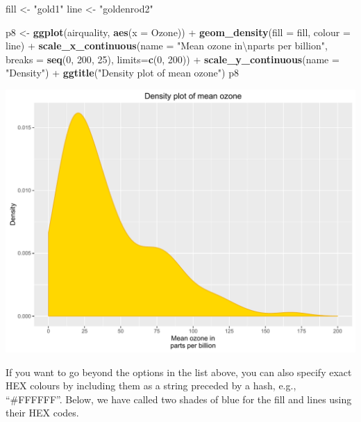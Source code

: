 \documentclass[]{article}
\newenvironment{Shaded}{\begin{snugshade}}{\end{snugshade}}
\newcommand{\KeywordTok}[1]{\textcolor[rgb]{0.13,0.29,0.53}{\textbf{{#1}}}}
\newcommand{\DataTypeTok}[1]{\textcolor[rgb]{0.13,0.29,0.53}{{#1}}}
\newcommand{\DecValTok}[1]{\textcolor[rgb]{0.00,0.00,0.81}{{#1}}}
\newcommand{\CharTok}[1]{\textcolor[rgb]{0.31,0.60,0.02}{{#1}}}
\newcommand{\StringTok}[1]{\textcolor[rgb]{0.31,0.60,0.02}{{#1}}}
\newcommand{\NormalTok}[1]{{#1}}
\begin{document}
\begin{Shaded}
\begin{Highlighting}[]
\NormalTok{fill <-}\StringTok{ "gold1"}
\NormalTok{line <-}\StringTok{ "goldenrod2"}

\NormalTok{p8 <-}\StringTok{ }\KeywordTok{ggplot}\NormalTok{(airquality, }\KeywordTok{aes}\NormalTok{(}\DataTypeTok{x =} \NormalTok{Ozone)) +}\StringTok{ }
\StringTok{      }\KeywordTok{geom_density}\NormalTok{(}\DataTypeTok{fill =} \NormalTok{fill, }\DataTypeTok{colour =} \NormalTok{line) +}
\StringTok{      }\KeywordTok{scale_x_continuous}\NormalTok{(}\DataTypeTok{name =} \StringTok{"Mean ozone in}\CharTok{\textbackslash{}n}\StringTok{parts per billion"}\NormalTok{,}
                         \DataTypeTok{breaks =} \KeywordTok{seq}\NormalTok{(}\DecValTok{0}\NormalTok{, }\DecValTok{200}\NormalTok{, }\DecValTok{25}\NormalTok{),}
                         \DataTypeTok{limits=}\KeywordTok{c}\NormalTok{(}\DecValTok{0}\NormalTok{, }\DecValTok{200}\NormalTok{)) +}
\StringTok{      }\KeywordTok{scale_y_continuous}\NormalTok{(}\DataTypeTok{name =} \StringTok{"Density"}\NormalTok{) +}
\StringTok{      }\KeywordTok{ggtitle}\NormalTok{(}\StringTok{"Density plot of mean ozone"}\NormalTok{)}
\NormalTok{p8}
\end{Highlighting}
\end{Shaded}

\begin{center}\includegraphics{0_all_posts_pdf/density_6-1} \end{center}

If you want to go beyond the options in the list above, you can also
specify exact HEX colours by including them as a string preceded by a
hash, e.g., ``\#FFFFFF''. Below, we have called two shades of blue for
the fill and lines using their HEX codes.
\end{document}

